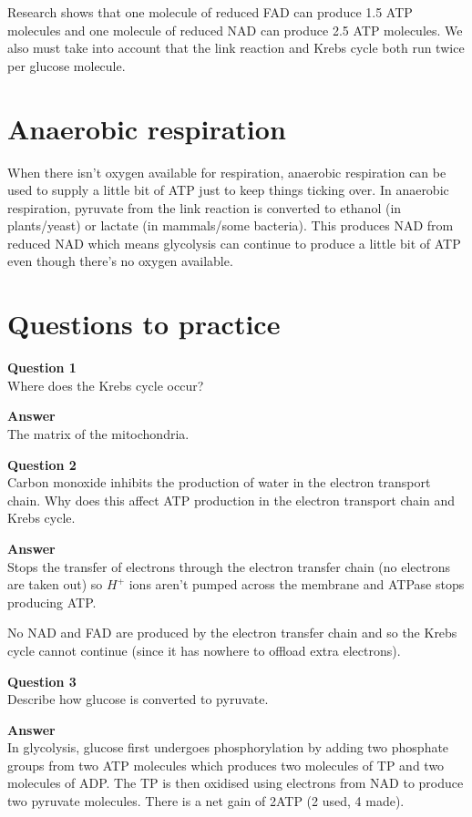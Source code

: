 \documentclass{article}
\begin{document}
Research shows that one molecule of reduced FAD can produce 1.5 ATP molecules and one molecule of reduced NAD can produce 2.5 ATP molecules. We also must take into account that the link reaction and Krebs cycle both run twice per glucose molecule.

\section*{Anaerobic respiration}
When there isn't oxygen available for respiration, anaerobic respiration can be used to supply a little bit of ATP just to keep things ticking over. In anaerobic respiration, pyruvate from the link reaction is converted to ethanol (in plants/yeast) or lactate (in mammals/some bacteria). This produces NAD from reduced NAD which means glycolysis can continue to produce a little bit of ATP even though there's no oxygen available.

\section*{Questions to practice}
\textbf{Question 1}\\
Where does the Krebs cycle occur?

\textbf{Answer}\\
The matrix of the mitochondria.

\textbf{Question 2}\\
Carbon monoxide inhibits the production of water in the electron transport chain. Why does this affect ATP production in the electron transport chain and Krebs cycle.

\textbf{Answer}\\
Stops the transfer of electrons through the electron transfer chain (no electrons are taken out) so $H^+$ ions aren't pumped across the membrane and ATPase stops producing ATP.

No NAD and FAD are produced by the electron transfer chain and so the Krebs cycle cannot continue (since it has nowhere to offload extra electrons).

\textbf{Question 3}\\
Describe how glucose is converted to pyruvate.

\textbf{Answer}\\
In glycolysis, glucose first undergoes phosphorylation by adding two phosphate groups from two ATP molecules which produces two molecules of TP and two molecules of ADP. The TP is then oxidised using electrons from NAD to produce two pyruvate molecules. There is a net gain of 2ATP (2 used, 4 made).
\end{document}
